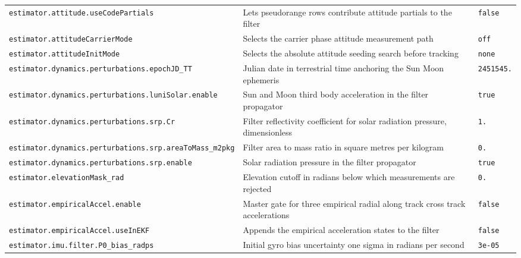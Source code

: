 \begin{center}
\begin{longtable}{>{\raggedright\arraybackslash\scriptsize\ttfamily}p{}|>{\raggedright\arraybackslash}p{}|>{\raggedright\arraybackslash\scriptsize\ttfamily}p{}}
\texttt{estimator.\allowbreak attitude.\allowbreak use\allowbreak Code\allowbreak Partials} & Lets pseudorange rows contribute attitude partials to the filter & \texttt{false} \\
\texttt{estimator.\allowbreak attitude\allowbreak Carrier\allowbreak Mode} & Selects the carrier phase attitude measurement path & \texttt{off} \\
\texttt{estimator.\allowbreak attitude\allowbreak Init\allowbreak Mode} & Selects the absolute attitude seeding search before tracking & \texttt{none} \\
\texttt{estimator.\allowbreak dynamics.\allowbreak perturbations.\allowbreak epoch\allowbreak JD\_\allowbreak TT} & Julian date in terrestrial time anchoring the Sun Moon ephemeris & \texttt{2451545.\allowbreak 0} \\
\texttt{estimator.\allowbreak dynamics.\allowbreak perturbations.\allowbreak luni\allowbreak Solar.\allowbreak enable} & Sun and Moon third body acceleration in the filter propagator & \texttt{true} \\
\texttt{estimator.\allowbreak dynamics.\allowbreak perturbations.\allowbreak srp.\allowbreak Cr} & Filter reflectivity coefficient for solar radiation pressure, dimensionless & \texttt{1.\allowbreak 24} \\
\texttt{estimator.\allowbreak dynamics.\allowbreak perturbations.\allowbreak srp.\allowbreak area\allowbreak To\allowbreak Mass\_\allowbreak m2pkg} & Filter area to mass ratio in square metres per kilogram & \texttt{0.\allowbreak 02} \\
\texttt{estimator.\allowbreak dynamics.\allowbreak perturbations.\allowbreak srp.\allowbreak enable} & Solar radiation pressure in the filter propagator & \texttt{true} \\
\texttt{estimator.\allowbreak elevation\allowbreak Mask\_\allowbreak rad} & Elevation cutoff in radians below which measurements are rejected & \texttt{0.\allowbreak 1745\allowbreak 3292\allowbreak 5199\allowbreak 43295} \\
\texttt{estimator.\allowbreak empirical\allowbreak Accel.\allowbreak enable} & Master gate for three empirical radial along track cross track accelerations & \texttt{false} \\
\texttt{estimator.\allowbreak empirical\allowbreak Accel.\allowbreak use\allowbreak In\allowbreak EKF} & Appends the empirical acceleration states to the filter & \texttt{false} \\
\texttt{estimator.\allowbreak imu.\allowbreak filter.\allowbreak P0\_\allowbreak bias\_\allowbreak radps} & Initial gyro bias uncertainty one sigma in radians per second & \texttt{3e-05} \\

\end{longtable}
\end{center}
